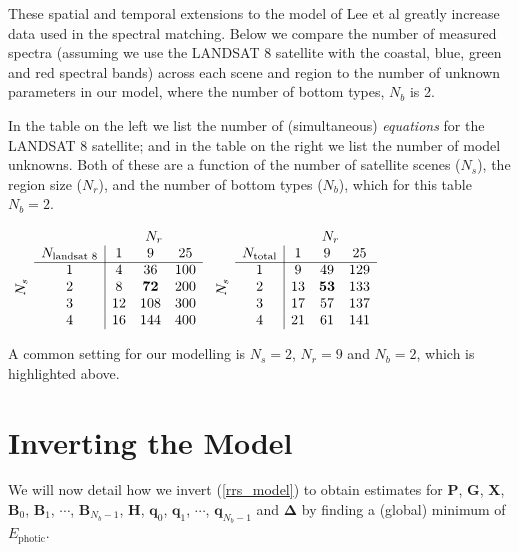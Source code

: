 \documentclass[12pt]{article}
\numberwithin{equation}{section}
\begin{document}
These spatial and temporal extensions to the model of Lee et al greatly increase data used 
in the spectral matching. Below we compare the number of measured spectra (assuming 
we use the LANDSAT 8 satellite with the coastal, blue, green and red spectral bands) 
across each scene and region to the number of unknown parameters in our model, where 
the number of bottom types, $N_b$ is 2.

\begin{table}[H]
\centering
\caption{In the table on the left we list the number of (simultaneous) \textit{equations} 
for the LANDSAT 8 satellite; and in the table on the right we list the number of model 
unknowns. Both of these are a function of the number of satellite scenes ($N_s$), the 
region size ($N_r$), and the number of bottom types ($N_b$), which for this table 
$N_b = 2$.}
\centerline{
$
  \begin{array}{cc|ccc}
    &\multicolumn{1}{c}{} & \multicolumn{3}{c}{N_r} \\
    &N_{\text{landsat 8}}& 1 & 9 & 25 \\
    \cline{2-5}
    & 1 & 4 & 36 & 100 \\
    \smash{\rotatebox[origin=c]{90}{$N_s$}} & 2 & 8 & \textbf{72} & 200 \\
    & 3 & 12 & 108 & 300 \\
    & 4 & 16 & 144 & 400 
  \end{array}
$ \qquad $
  \begin{array}{cc|ccc}
    &\multicolumn{1}{c}{} & \multicolumn{3}{c}{N_r} \\
    &N_{\text{total}}& 1 & 9 & 25 \\
    \cline{2-5}
    & 1 & 9 & 49 & 129 \\
    \smash{\rotatebox[origin=c]{90}{$N_s$}} & 2 & 13 & \textbf{53} & 133 \\
    & 3 & 17 & 57 & 137 \\
    & 4 & 21 & 61 & 141  
  \end{array}
$}
\end{table}

\medskip

\noindent A common setting for our modelling is $N_s = 2$, $N_r = 9$ and $N_b = 2$, which is highlighted above. 

\section{Inverting the Model}

We will now detail how we invert (\ref{rrs_model}) to obtain estimates for \textbf{P}, 
\textbf{G}, \textbf{X}, $\textbf{B}_0$, $\textbf{B}_1$, $\cdots$, $\textbf{B}_{N_b-1}$, 
\textbf{H}, $\textbf{q}_0$, $\textbf{q}_1$, $\cdots$, $\textbf{q}_{N_b-1}$ and 
$\mathbf{\Delta}$ by finding a (global) minimum of $E_{\text{photic}}$. 
 
\end{document}
